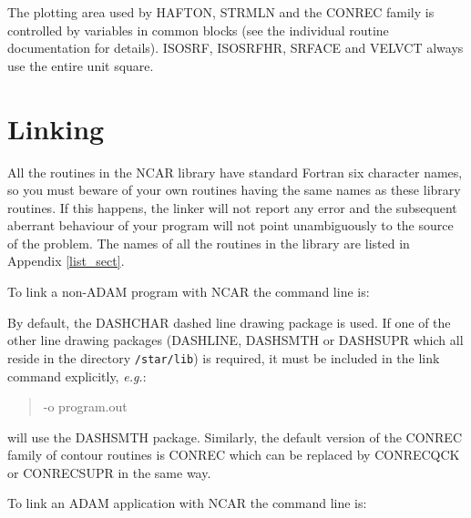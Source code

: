 \documentclass[twoside,11pt,nolof,noabs]{starlink}
\begin{document}
The plotting area used by HAFTON, STRMLN and the CONREC family is controlled
by variables in common blocks (see the individual routine documentation for
details).
ISOSRF, ISOSRFHR, SRFACE and VELVCT always use the entire unit
square.


\section{Linking}

All the routines in the NCAR library have standard Fortran six
character names, so you must beware of your own routines having the
same names as these library routines.  If this happens, the linker will
not report any error and the subsequent aberrant behaviour of your
program will not point unambiguously to the source of the problem.  The
names of all the routines in the library are listed in Appendix
\ref{list_sect}.

\begin{sloppypar}
To link a non-ADAM program with NCAR the command line is:
\end{sloppypar}

\begin{quote}
\begin{small}
\begin{terminalv}
\end{terminalv}
\end{small}
\end{quote}

By default, the DASHCHAR dashed line drawing package is used.  If one
of the other line drawing packages (DASHLINE, DASHSMTH or DASHSUPR
which all reside in the directory \texttt{/star/lib}) is required, it must
be included in the link command explicitly, \emph{e.g.}:

\begin{quote}
\begin{terminalv}
       -o program.out
\end{terminalv}
\end{quote}

will use the DASHSMTH package.
Similarly, the default version of the CONREC family of contour routines is
CONREC which can be replaced by CONRECQCK or CONRECSUPR in the same way.

To link an ADAM application with NCAR the command line is:

\begin{quote}
\begin{terminalv}
\end{terminalv}
\end{quote}
\end{document}

